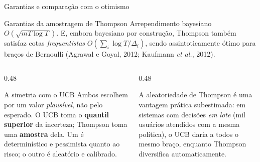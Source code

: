 \documentclass[aspectratio=169, 10pt]{beamer}
\newcommand{\gap}{\Delta}
\begin{document}
\begin{frame}{Garantias e comparação com o otimismo}
  \begin{teobox}{Garantias da amostragem de Thompson}
    Arrependimento bayesiano $O(\sqrt{mT\log T})$. E, embora bayesiano por
    construção, Thompson também satisfaz cotas \emph{frequentistas}
    $O(\sum_i \log T / \gap_i)$, sendo assintoticamente ótimo para braços
    de Bernoulli (Agrawal e Goyal, 2012; Kaufmann \emph{et al.}, 2012).
  \end{teobox}

  \begin{columns}[T]
    \begin{column}{0.48\textwidth}
      \begin{defbox}{A simetria com o UCB}
        Ambos escolhem por um valor \emph{plausível}, não pelo esperado. O
        UCB toma o \textbf{quantil superior} da incerteza; Thompson toma
        uma \textbf{amostra} dela. Um é determinístico e pessimista quanto
        ao risco; o outro é aleatório e calibrado.
      \end{defbox}
    \end{column}
    \begin{column}{0.48\textwidth}
      \begin{alertabox}
        A aleatoriedade de Thompson é uma vantagem prática subestimada: em
        sistemas com decisões \emph{em lote} (mil usuários atendidos com a
        mesma política), o UCB daria a todos o mesmo braço, enquanto
        Thompson diversifica automaticamente.
      \end{alertabox}
    \end{column}
  \end{columns}
\end{frame}
\end{document}
